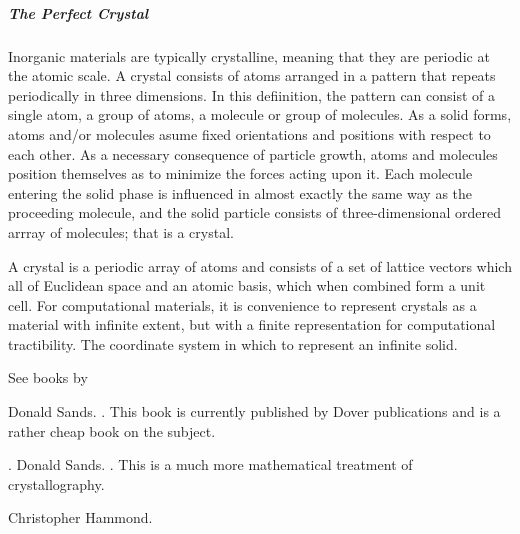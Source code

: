 \documentclass[letterpaper,10pt,english]{sphinxmanual}
\begin{document}
\subparagraph{The Perfect Crystal}
\label{\detokenize{crystallography/perfect_crystal:the-perfect-crystal}}
Inorganic materials are typically crystalline, meaning that they are periodic at the atomic scale.
A crystal consists of atoms arranged in a pattern that repeats periodically in three dimensions.  In this defiinition, the pattern can consist of a single atom, a group of atoms, a molecule or group of molecules.  As a solid forms, atoms and/or molecules asume fixed orientations and positions with respect to each other.  As a necessary consequence of particle growth, atoms and molecules position themselves as to minimize the forces acting upon it.  Each molecule entering the solid phase is influenced in almost exactly the same way as the proceeding molecule, and the solid particle consists of three-dimensional ordered arrray of molecules; that is a crystal.

A crystal is a periodic array of atoms and consists of a set of lattice vectors which all of Euclidean space and an atomic basis, which when combined form a unit cell.  For computational materials, it is convenience to represent crystals as a material with infinite extent, but with a finite representation for computational tractibility.  The coordinate system in which to represent an infinite solid.

See books by

\label{\detokenize{crystallography/perfect_crystal:id1}}{\hyperref[\detokenize{crystallography/perfect_crystal:sands1969-book-crystals}]{\sphinxcrossref{{[}San69{]}}}} Donald Sands. .  This book is currently published by Dover publications and is a rather cheap book on the subject.

\label{\detokenize{crystallography/perfect_crystal:id2}}{\hyperref[\detokenize{crystallography/perfect_crystal:sands2002-book-crystals-2}]{\sphinxcrossref{{[}San02{]}}}}. Donald Sands. .  This is a much more mathematical treatment of crystallography.

\label{\detokenize{crystallography/perfect_crystal:id3}}{\hyperref[\detokenize{crystallography/perfect_crystal:hammond2001-book-crystal}]{\sphinxcrossref{{[}HH01{]}}}} Christopher Hammond. 
\end{document}
